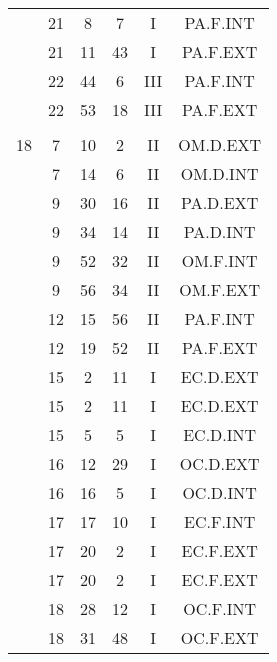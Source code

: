 \documentclass[12pt, a4paper]{article}
\begin{document}
\begin{multicols}{3}
{\begin{tabular}{c c c c c c}
	 	 	 	 & 21 & 8 & 7 & I & PA.F.INT\\%
	 	 	 	 & 21 & 11 & 43 & I & PA.F.EXT\\%
	 	 	 	 & 22 & 44 & 6 & III & PA.F.INT\\%
	 	 	 	 & 22 & 53 & 18 & III & PA.F.EXT\\%
	 	 	 	 & & & & & \\%
	 	 	 	18 & 7 & 10 & 2 & II & OM.D.EXT\\%
	 	 	 	 & 7 & 14 & 6 & II & OM.D.INT\\%
	 	 	 	 & 9 & 30 & 16 & II & PA.D.EXT\\%
	 	 	 	 & 9 & 34 & 14 & II & PA.D.INT\\%
	 	 	 	 & 9 & 52 & 32 & II & OM.F.INT\\%
	 	 	 	 & 9 & 56 & 34 & II & OM.F.EXT\\%
	 	 	 	 & 12 & 15 & 56 & II & PA.F.INT\\%
	 	 	 	 & 12 & 19 & 52 & II & PA.F.EXT\\%
	 	 	 	 & 15 & 2 & 11 & I & EC.D.EXT\\%
	 	 	 	 & 15 & 2 & 11 & I & EC.D.EXT\\%
	 	 	 	 & 15 & 5 & 5 & I & EC.D.INT\\%
	 	 	 	 & 16 & 12 & 29 & I & OC.D.EXT\\%
	 	 	 	 & 16 & 16 & 5 & I & OC.D.INT\\%
	 	 	 	 & 17 & 17 & 10 & I & EC.F.INT\\%
	 	 	 	 & 17 & 20 & 2 & I & EC.F.EXT\\%
	 	 	 	 & 17 & 20 & 2 & I & EC.F.EXT\\%
	 	 	 	 & 18 & 28 & 12 & I & OC.F.INT\\%
	 	 	 	 & 18 & 31 & 48 & I & OC.F.EXT\\%

\end{tabular}}
\end{multicols}
\end{document}
